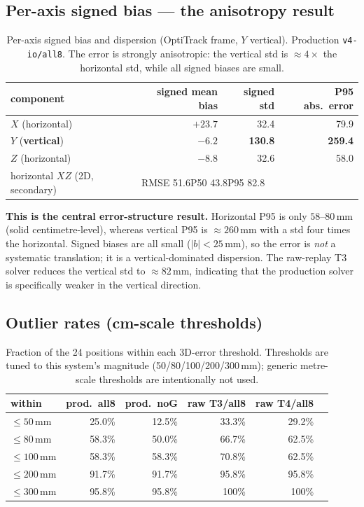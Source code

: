 \documentclass[11pt,a4paper]{article}
\newcommand{\mm}{\,\si{\milli\meter}}
\begin{document}
\subsection{Per-axis signed bias --- the anisotropy result}
\begin{table}[h]
\centering
\caption{Per-axis signed bias and dispersion (OptiTrack frame, $Y$ vertical). Production
\texttt{v4-io/all8}. The error is strongly anisotropic: the vertical std is $\approx\!4\times$
the horizontal std, while all signed biases are small.}
\begin{tabular}{lrrr}
\toprule
component & signed mean bias & signed std & P95 abs.\ error \\
\midrule
$X$ (horizontal)        & $+23.7$ & 32.4  & 79.9  \\
$Y$ (\textbf{vertical}) & $-6.2$  & \textbf{130.8} & \textbf{259.4} \\
$Z$ (horizontal)        & $-8.8$  & 32.6  & 58.0  \\
\midrule
horizontal $XZ$ (2D, secondary) & \multicolumn{3}{l}{RMSE 51.6\quad P50 43.8\quad P95 82.8} \\
\bottomrule
\end{tabular}
\end{table}

\noindent
\textbf{This is the central error-structure result.} Horizontal P95 is only $58$--$80\mm$
(solid centimetre-level), whereas vertical P95 is $\approx\!260\mm$ with a std four times the
horizontal. Signed biases are all small ($|b|<25\mm$), so the error is \emph{not} a
systematic translation; it is a vertical-dominated dispersion. The raw-replay T3 solver
reduces the vertical std to $\approx\!82\mm$, indicating that the production solver is
specifically weaker in the vertical direction.

\subsection{Outlier rates (cm-scale thresholds)}
\begin{table}[h]
\centering
\caption{Fraction of the 24 positions within each 3D-error threshold. Thresholds are tuned
to this system's magnitude (50/80/100/200/300\,\si{\milli\meter}); generic metre-scale
thresholds are intentionally not used.}
\begin{tabular}{lrrrrr}
\toprule
within & prod.\ all8 & prod.\ noG & raw T3/all8 & raw T4/all8 \\
\midrule
$\le 50\mm$  & 25.0\% & 12.5\% & 33.3\% & 29.2\% \\
$\le 80\mm$  & 58.3\% & 50.0\% & 66.7\% & 62.5\% \\
$\le 100\mm$ & 58.3\% & 58.3\% & 70.8\% & 62.5\% \\
$\le 200\mm$ & 91.7\% & 91.7\% & 95.8\% & 95.8\% \\
$\le 300\mm$ & 95.8\% & 95.8\% & 100\%  & 100\%  \\
\bottomrule
\end{tabular}
\end{table}
\end{document}
